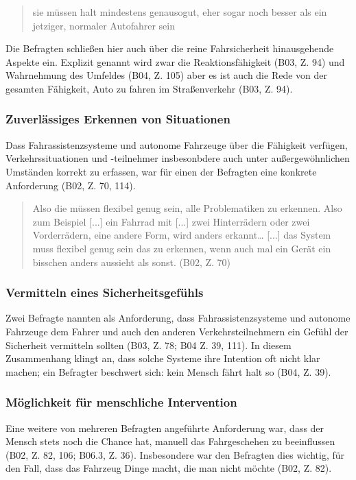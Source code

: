 \documentclass[12pt]{article}
\begin{document}
\begin{quote}
  sie müssen halt mindestens genausogut, eher sogar noch besser als ein jetziger, normaler Autofahrer sein
\end{quote}

Die Befragten schließen hier auch über die reine Fahrsicherheit hinausgehende Aspekte ein. Explizit genannt wird zwar die Reaktionsfähigkeit (B03, Z. 94) und Wahrnehmung des Umfeldes (B04, Z. 105) aber es ist auch die Rede von \glqq der gesamten Fähigkeit, Auto zu fahren im Straßenverkehr\grqq{} (B03, Z. 94).

\subsubsection*{Zuverlässiges Erkennen von Situationen}
Dass Fahrassistenzsysteme und autonome Fahrzeuge über die Fähigkeit verfügen, Verkehrssituationen und -teilnehmer insbesonbdere auch unter außergewöhnlichen Umständen korrekt zu erfassen, war für einen der Befragten eine konkrete Anforderung (B02, Z. 70, 114).

\begin{quote}
  Also die müssen flexibel genug sein, alle Problematiken zu erkennen. Also zum Beispiel [...] ein Fahrrad mit [...] zwei Hinterrädern oder zwei Vorderrädern, eine andere Form, wird anders erkannt… [...] das System muss flexibel genug sein das zu erkennen, wenn auch mal ein Gerät ein bisschen anders aussieht als sonst. (B02, Z. 70)
\end{quote}

\subsubsection*{Vermitteln eines Sicherheitsgefühls}
 Zwei Befragte nannten als Anforderung, dass Fahrassistenzsysteme und autonome Fahrzeuge dem Fahrer und auch den anderen Verkehrsteilnehmern ein Gefühl der Sicherheit vermitteln sollten (B03, Z. 78; B04 Z. 39, 111). In diesem Zusammenhang klingt an, dass solche Systeme ihre Intention oft nicht klar machen; ein Befragter beschwert sich: \glqq kein Mensch fährt halt so\grqq{} (B04, Z. 39).

\subsubsection*{Möglichkeit für menschliche Intervention}
Eine weitere von mehreren Befragten angeführte Anforderung war, dass der Mensch stets noch die Chance hat, manuell das Fahrgeschehen zu beeinflussen (B02, Z. 82, 106; B06.3, Z. 36). Insbesondere war den Befragten dies wichtig, für den Fall, dass \glqq das Fahrzeug Dinge macht, die man nicht möchte\grqq{} (B02, Z. 82).
\end{document}
